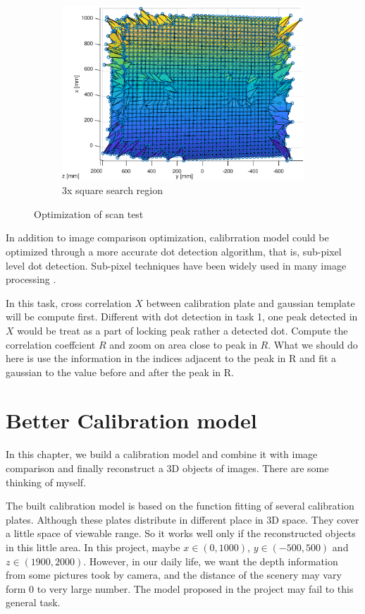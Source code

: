 \begin{figure}[h!]
\begin{subfigure}[t]{0.3\linewidth}
		\includegraphics[width=1\linewidth]{figures/part2/scan3}
		\caption{3x square search region}
		\label{fig:scan_op_c}
	\end{subfigure}
	\caption{Optimization of scan test}
	\label{fig:scan_op}
\end{figure}

In addition to image comparison optimization, calibrration model could be optimized through a more accurate dot detection algorithm, that is, sub-pixel level dot detection. Sub-pixel techniques have been widely used in many image processing \cite{Avrahami1991Sub}\cite{Haskett2001Ares}\cite{Huertas2009Detection}. 

In this task, cross correlation $X$ between calibration plate and gaussian template will be compute first. Different with dot detection in task 1, one peak detected in $X$ would be treat as a part of locking peak rather a detected dot. Compute the correlation coeffcient $R$ and zoom on area close to peak in $R$. What we should do here is use the information in the indices adjacent to the peak in R and fit a gaussian to the value before and after the peak in R.


\section{Better Calibration model}

In this chapter, we build a calibration model and combine it with image comparison and finally reconstruct a 3D objects of images. There are some thinking of myself. 

The built calibration model is based on the function fitting of several calibration plates. Although these plates distribute in different place in 3D space. They cover a little space of viewable range. So it works well only if the reconstructed objects in this little area. In this project, maybe $x\in (0,1000)$, $y\in (-500,500)$ and $z\in (1900,2000)$. However, in our daily life, we want the depth information from some pictures took by camera, and the distance of the scenery may vary form 0 to very large number. The model proposed in the project may fail to this general task. 

